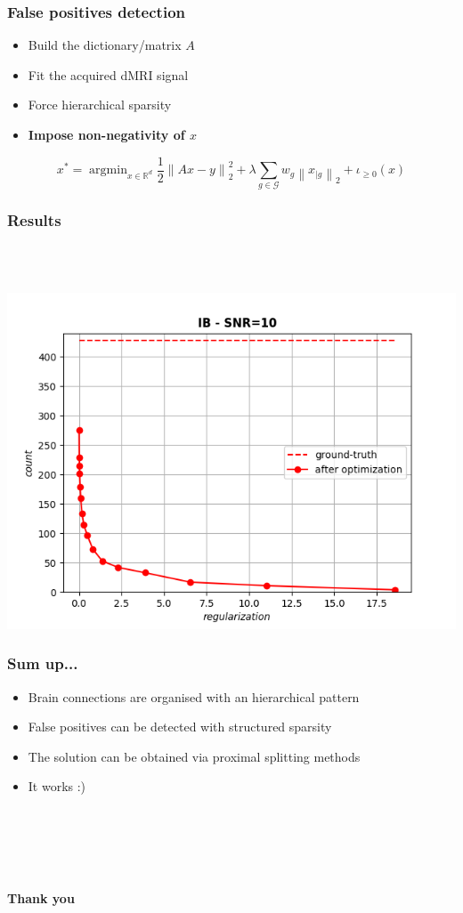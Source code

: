 \documentclass[aspectratio=169]{beamer}
\newcommand{\rd}{\mathbb{R}^d}
\newcommand{\norm}[1]{\left\|#1\right\|}
\newcommand{\normtwosq}[1]{\left\|#1\right\|_2^2}
\newcommand{\onehalf}{\frac{1}{2}}
\DeclareMathOperator*{\argmin}{argmin}
\begin{document}
		\begin{frame}
		\frametitle{False positives detection}
		\begin{itemize}
		\item Build the dictionary/matrix $A$
		\item Fit the acquired dMRI signal
		\item Force hierarchical sparsity
		\pause\item \textbf{Impose non-negativity of $x$}
		\end{itemize}
		
		\pause
		
		\begin{equation}
		\nonumber x^* = \argmin_{x\in \rd}\onehalf\normtwosq{Ax-y} + \lambda \sum_{g\in\mathcal{G}}w_g\norm{x_{|g}}_2 + \iota_{\ge 0}(x)
		\end{equation}
		\end{frame}
		
		\begin{frame}
		\frametitle{Results}
		\quad \\ \quad \\
		\begin{center}
		\includegraphics[width=.7\linewidth]{img/ResultsIBtr.png}
		\end{center}
		\end{frame}
		
		\begin{frame}
		\frametitle{Sum up...}
		\begin{itemize}
		\item Brain connections are organised with an hierarchical pattern
		\item False positives can be detected with structured sparsity
		\item The solution can be obtained via proximal splitting methods
		\pause\item It works :)
		\end{itemize}
		\quad \\ \quad \\ \quad \\ \quad \\
		\pause
		\begin{center}
		{\Huge \textbf{\smiley Thank you \smiley}}
		\end{center}
		\end{frame}
		
\end{document}
